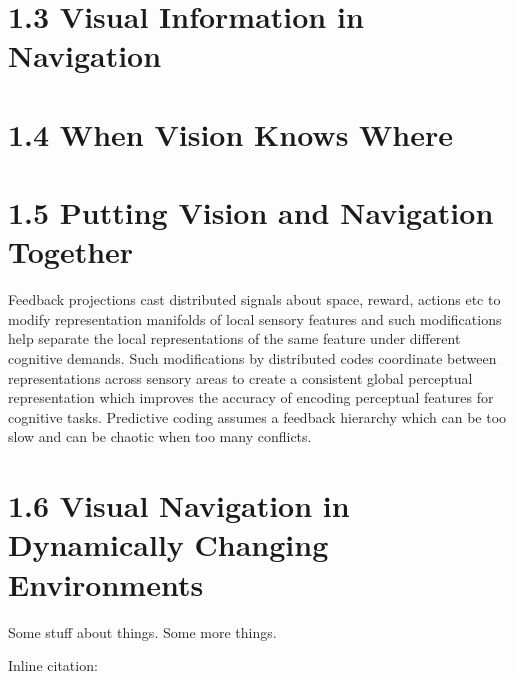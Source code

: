 \section{1.3 Visual Information in Navigation}


\section{1.4 When Vision Knows Where}


\section{1.5 Putting Vision and Navigation Together}

Feedback projections cast distributed signals about space, reward, actions etc to modify representation manifolds of local sensory features and such modifications help separate the local representations of the same feature under different cognitive demands. Such modifications by distributed codes coordinate between representations across sensory areas to create a consistent global perceptual representation which improves the accuracy of encoding perceptual features for cognitive tasks. Predictive coding assumes a feedback hierarchy which can be too slow and can be chaotic when too many conflicts.
\section{1.6 Visual Navigation in Dynamically Changing Environments}

Some stuff about things.\cite{example-citation} Some more things. 

Inline citation: 

\blindtext
